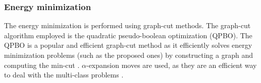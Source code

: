 \subsubsection{Energy minimization}
The energy minimization is performed using graph-cut methods. The graph-cut algorithm employed is the quadratic pseudo-boolean optimization (QPBO). The QPBO is a popular and efficient graph-cut method as it efficiently solves energy minimization problems (such as the proposed ones) by constructing a graph and computing the min-cut \cite{kolmogorov2007minimizing}. $\alpha$-expansion moves are used, as they are an efficient way to deal with the multi-class problems \cite{kolmogorov2004energy}. \\

\stopcontents[chapters]